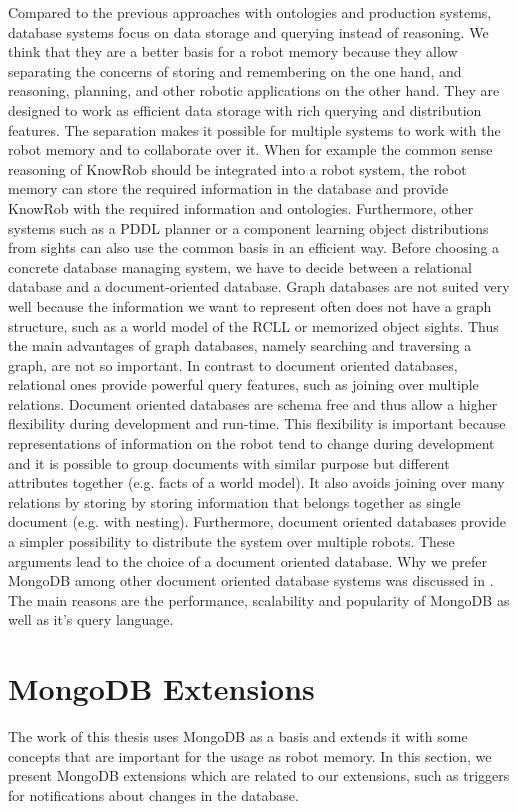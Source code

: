 Compared to the previous approaches with ontologies and production
systems, database systems focus on data storage and querying instead
of reasoning. We think that they are a better basis for a robot memory
because they allow separating the concerns of storing and remembering
on the one hand, and reasoning, planning, and other robotic
applications on the other hand. They are designed to work as efficient
data storage with rich querying and distribution features. The
separation makes it possible for multiple systems to work with the
robot memory and to collaborate over it. When for example the common
sense reasoning of KnowRob should be integrated into a robot system,
the robot memory can store the required information in the database
and provide KnowRob with the required information and
ontologies. Furthermore, other systems such as a PDDL planner or a
component learning object distributions from sights can also use the
common basis in an efficient way. Before choosing a concrete database
managing system, we have to decide between a relational database and a
document-oriented database. Graph databases are not suited very well
because the information we want to represent often does not have a
graph structure, such as a world model of the RCLL or memorized object
sights. Thus the main advantages of graph databases, namely searching
and traversing a graph, are not so important.  In contrast to document
oriented databases, relational ones provide powerful query features,
such as joining over multiple relations. Document oriented databases
are schema free and thus allow a higher flexibility during development
and run-time. This flexibility is important because representations of
information on the robot tend to change during development and it is
possible to group documents with similar purpose but different
attributes together (e.g. facts of a world model). It also avoids
joining over many relations by storing by storing information that
belongs together as single document (e.g. with nesting).  Furthermore,
document oriented databases provide a simpler possibility to
distribute the system over multiple robots. These arguments lead to
the choice of a document oriented database. Why we prefer MongoDB
among other document oriented database systems was discussed in
. The main reasons are the performance,
scalability and popularity of MongoDB as well as it's query language.

\section{MongoDB Extensions}
\label{sec:mongodb-extensions}
The work of this thesis uses MongoDB as a basis and extends it with
some concepts that are important for the usage as robot memory. In
this section, we present MongoDB extensions which are related to our
extensions, such as triggers for notifications about changes
in the database.

